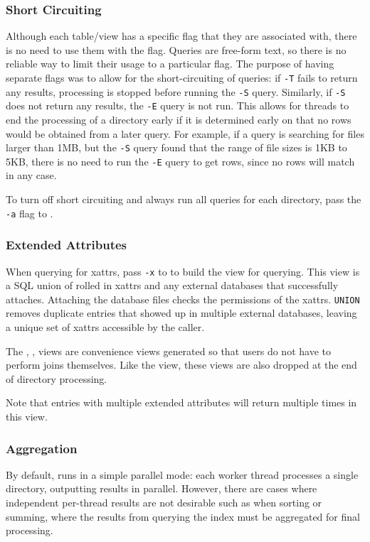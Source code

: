 \subsubsection{Short Circuiting}
Although each table/view has a specific flag that they are associated
with, there is no need to use them with the flag. Queries are
free-form text, so there is no reliable way to limit their usage to a
particular flag. The purpose of having separate flags was to allow for
the short-circuiting of queries: if \texttt{-T} fails to return any
results, processing is stopped before running the \texttt{-S}
query. Similarly, if \texttt{-S} does not return any results, the
\texttt{-E} query is not run. This allows for threads to end the
processing of a directory early if it is determined early on that no
rows would be obtained from a later query. For example, if a query is
searching for files larger than 1MB, but the \texttt{-S} query found
that the range of file sizes is 1KB to 5KB, there is no need to run
the \texttt{-E} query to get rows, since no rows will match in any
case.

To turn off short circuiting and always run all queries for each
directory, pass the \texttt{-a} flag to \gufiquery.

\subsubsection{Extended Attributes}
When querying for xattrs, pass \texttt{-x} to \gufiquery to build the
\xattrs view for querying. This view is a SQL union of rolled in
xattrs and any external databases that successfully
attaches. Attaching the database files checks the permissions of the
xattrs. \texttt{UNION} removes duplicate entries that showed up in
multiple external databases, leaving a unique set of xattrs accessible
by the caller.

The \xentries, \xpentries, \xsummary views are convenience views
generated so that users do not have to perform joins themselves. Like
the \xattrs view, these views are also dropped at the end of directory
processing.

Note that entries with multiple extended attributes will return
multiple times in this view.

\subsubsection{Aggregation}
By default, \gufiquery runs in a simple parallel mode: each worker
thread processes a single directory, outputting results in
parallel. However, there are cases where independent per-thread
results are not desirable such as when sorting or summing, where the
results from querying the index must be aggregated for final
processing.

